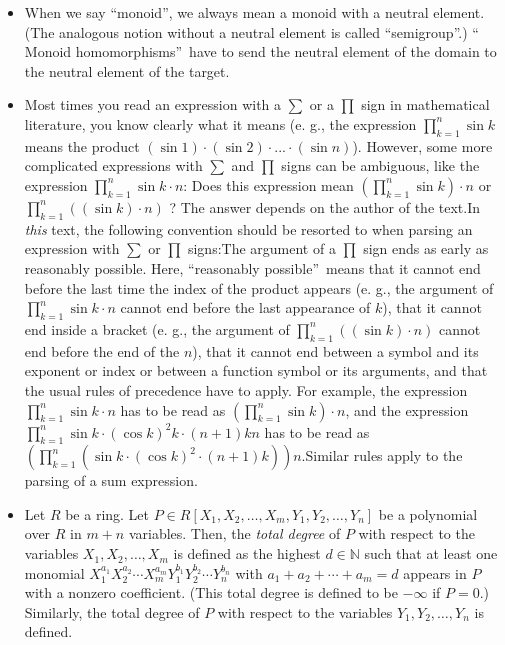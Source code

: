 \documentclass[numbers=enddot,12pt,final,onecolumn,notitlepage]{scrartcl}%
\begin{document}
\begin{itemize}
\item When we say \textquotedblleft monoid\textquotedblright, we always mean a
monoid with a neutral element. (The analogous notion without a neutral element
is called \textquotedblleft semigroup\textquotedblright.) \textquotedblleft
Monoid homomorphisms\textquotedblright\ have to send the neutral element of
the domain to the neutral element of the target.

\item Most times you read an expression with a $\sum$ or a $\prod$ sign in
mathematical literature, you know clearly what it means (e. g., the expression
$\prod\limits_{k=1}^{n}\sin k$ means the product $\left(  \sin1\right)
\cdot\left(  \sin2\right)  \cdot...\cdot\left(  \sin n\right)  $). However,
some more complicated expressions with $\sum$ and $\prod$ signs can be
ambiguous, like the expression $\prod\limits_{k=1}^{n}\sin k\cdot n$: Does
this expression mean $\left(  \prod\limits_{k=1}^{n}\sin k\right)  \cdot n$ or
$\prod\limits_{k=1}^{n}\left(  \left(  \sin k\right)  \cdot n\right)  $ ? The
answer depends on the author of the text.\newline In \textit{this} text, the
following convention should be resorted to when parsing an expression with
$\sum$ or $\prod$ signs:\newline The argument of a $\prod$ sign ends as early
as reasonably possible. Here, \textquotedblleft reasonably
possible\textquotedblright\ means that it cannot end before the last time the
index of the product appears (e. g., the argument of $\prod\limits_{k=1}%
^{n}\sin k\cdot n$ cannot end before the last appearance of $k$), that it
cannot end inside a bracket (e. g., the argument of $\prod\limits_{k=1}%
^{n}\left(  \left(  \sin k\right)  \cdot n\right)  $ cannot end before the end
of the $n$), that it cannot end between a symbol and its exponent or index or
between a function symbol or its arguments, and that the usual rules of
precedence have to apply. For example, the expression $\prod\limits_{k=1}%
^{n}\sin k\cdot n$ has to be read as $\left(  \prod\limits_{k=1}^{n}\sin
k\right)  \cdot n$, and the expression $\prod\limits_{k=1}^{n}\sin
k\cdot\left(  \cos k\right)  ^{2}k\cdot\left(  n+1\right)  kn$ has to be read
as $\left(  \prod\limits_{k=1}^{n}\left(  \sin k\cdot\left(  \cos k\right)
^{2}\cdot\left(  n+1\right)  k\right)  \right)  n$.\newline Similar rules
apply to the parsing of a sum expression.

\item Let $R$ be a ring. Let $P\in R\left[  X_{1},X_{2},\ldots,X_{m}%
,Y_{1},Y_{2},\ldots,Y_{n}\right]  $ be a polynomial over $R$ in $m+n$
variables. Then, the \textit{total degree} of $P$ with respect to the
variables $X_{1},X_{2},\ldots,X_{m}$ is defined as the highest $d\in
\mathbb{N}$ such that at least one monomial $X_{1}^{a_{1}}X_{2}^{a_{2}}\cdots
X_{m}^{a_{m}}Y_{1}^{b_{1}}Y_{2}^{b_{2}}\cdots Y_{n}^{b_{n}}$ with $a_{1}%
+a_{2}+\cdots+a_{m}=d$ appears in $P$ with a nonzero coefficient. (This total
degree is defined to be $-\infty$ if $P=0$.) Similarly, the total degree of
$P$ with respect to the variables $Y_{1},Y_{2},\ldots,Y_{n}$ is defined.


\end{itemize}
\end{document}
